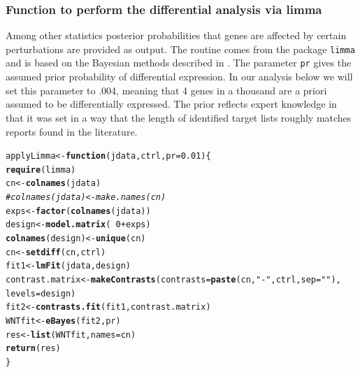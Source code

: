 \documentclass[a4paper]{article}
\makeatletter
\newcommand{\hlnum}[1]{\textcolor[rgb]{0.686,0.059,0.569}{#1}}%
\newcommand{\hlstr}[1]{\textcolor[rgb]{0.192,0.494,0.8}{#1}}%
\newcommand{\hlcom}[1]{\textcolor[rgb]{0.678,0.584,0.686}{\textit{#1}}}%
\newcommand{\hlopt}[1]{\textcolor[rgb]{0,0,0}{#1}}%
\newcommand{\hlstd}[1]{\textcolor[rgb]{0.345,0.345,0.345}{#1}}%
\newcommand{\hlkwa}[1]{\textcolor[rgb]{0.161,0.373,0.58}{\textbf{#1}}}%
\newcommand{\hlkwb}[1]{\textcolor[rgb]{0.69,0.353,0.396}{#1}}%
\newcommand{\hlkwc}[1]{\textcolor[rgb]{0.333,0.667,0.333}{#1}}%
\newcommand{\hlkwd}[1]{\textcolor[rgb]{0.737,0.353,0.396}{\textbf{#1}}}%
\newenvironment{kframe}{%
 \def\at@end@of@kframe{}%
 \ifinner\ifhmode%
  \def\at@end@of@kframe{\end{minipage}}%
  \begin{minipage}{\columnwidth}%
 \fi\fi%
 \def\FrameCommand##1{\hskip\@totalleftmargin \hskip-\fboxsep
 \colorbox{shadecolor}{##1}\hskip-\fboxsep
     \hskip-\linewidth \hskip-\@totalleftmargin \hskip\columnwidth}%
 \MakeFramed {\advance\hsize-\width
   \@totalleftmargin\z@ \linewidth\hsize
   \@setminipage}}%
 {\par\unskip\endMakeFramed%
 \at@end@of@kframe}
\newenvironment{knitrout}{}{} %
\makeatother
\begin{document}
\subsubsection*{Function to perform the differential analysis via limma} 
Among other statistics posterior probabilities that genes are affected by certain perturbations are provided as output. The routine comes from the package \verb'limma' and is based on the Bayesian methods described in \cite{art:Smyth2004}. The parameter \verb'pr' gives the assumed prior probability of differential expression. In our analysis below we will set this parameter to .004, meaning that 4 genes in a thousand are a priori assumed to be differentially expressed. The prior reflects expert knowledge in that it was set in a way that the length of identified target lists roughly matches reports found in the literature.
\\
% 
\begin{knitrout}
\color{fgcolor}\begin{kframe}
\begin{alltt}
\hlstd{applyLimma} \hlkwb{<-} \hlkwa{function}\hlstd{(}\hlkwc{jdata}\hlstd{,} \hlkwc{ctrl}\hlstd{,} \hlkwc{pr} \hlstd{=} \hlnum{0.01}\hlstd{) \{}
    \hlkwd{require}\hlstd{(limma)}
    \hlstd{cn} \hlkwb{<-} \hlkwd{colnames}\hlstd{(jdata)}
    \hlcom{# colnames(jdata) <- make.names(cn)}
    \hlstd{exps} \hlkwb{<-} \hlkwd{factor}\hlstd{(}\hlkwd{colnames}\hlstd{(jdata))}
    \hlstd{design} \hlkwb{<-} \hlkwd{model.matrix}\hlstd{(}\hlopt{~}\hlnum{0} \hlopt{+} \hlstd{exps)}
    \hlkwd{colnames}\hlstd{(design)} \hlkwb{<-} \hlkwd{unique}\hlstd{(cn)}
    \hlstd{cn} \hlkwb{<-} \hlkwd{setdiff}\hlstd{(cn, ctrl)}
    \hlstd{fit1} \hlkwb{<-} \hlkwd{lmFit}\hlstd{(jdata, design)}
    \hlstd{contrast.matrix} \hlkwb{<-} \hlkwd{makeContrasts}\hlstd{(}\hlkwc{contrasts} \hlstd{=} \hlkwd{paste}\hlstd{(cn,} \hlstr{"-"}\hlstd{, ctrl,} \hlkwc{sep} \hlstd{=} \hlstr{""}\hlstd{),}
        \hlkwc{levels} \hlstd{= design)}
    \hlstd{fit2} \hlkwb{<-} \hlkwd{contrasts.fit}\hlstd{(fit1, contrast.matrix)}
    \hlstd{WNTfit} \hlkwb{<-} \hlkwd{eBayes}\hlstd{(fit2, pr)}
    \hlstd{res} \hlkwb{<-} \hlkwd{list}\hlstd{(WNTfit,} \hlkwc{names} \hlstd{= cn)}
    \hlkwd{return}\hlstd{(res)}
\hlstd{\}}
\end{alltt}
\end{kframe}
\end{knitrout}
\end{document}

